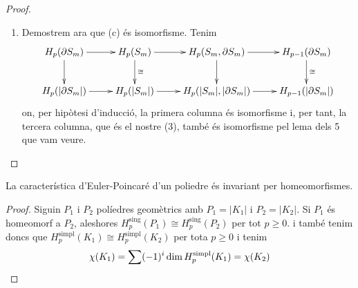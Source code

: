 \documentclass[../main.tex]{subfiles}
\begin{document}
\begin{proof}
\begin{enumerate}[(1)]
\begin{enumerate}
        \item Demostrem ara que (c) és isomorfisme. Tenim 
        \begin{equation}
            \notag
            \xymatrix{
            H_p(\partial S_m)\ar[r]\ar[d] & H_p(S_m)\ar[r]\ar[d]^{\cong} & H_p(S_m,\partial S_m)\ar[r]\ar[d] & H_{p-1}(\partial S_m)\ar[d]^{\cong}\\
            H_p(|\partial S_m|)\ar[r]&H_p(|S_m|)\ar[r] &H_p(|S_m|,|\partial S_m|)\ar[r]&H_{p-1}(|\partial S_m|)
            }
        \end{equation} 
        on, per hipòtesi d'inducció, la primera columna és isomorfisme i, per tant, la tercera columna, que és el nostre (3), també és isomorfisme pel lema dels 5 que vam veure.
    \end{enumerate}
\end{enumerate}
\end{proof}

\begin{coro}
La característica d'Euler-Poincaré d'un poliedre és invariant per homeomorfismes.
\end{coro}
\begin{proof}
Siguin $P_1$ i $P_2$ políedres geomètrics amb $P_1 = |K_1|$ i $P_2 = |K_2|$. Si $P_1$ és homeomorf a $P_2$, aleshores $H_p^{\mathrm{sing}}(P_1)\cong H_p^{\mathrm{sing}}(P_2)$ per tot $p\geq 0$. i també tenim doncs que $H_p^{\mathrm{simpl}}(K_1)\cong H_p^{\mathrm{simpl}}(K_2)$ per tota $p\geq 0$ i tenim
\begin{equation}
    \notag
    \chi(K_1) = \sum(-1)^{i}\dim H_p^{\mathrm{simpl}}(K_1) = \chi(K_2)
\end{equation}
\end{proof}
\end{document}
